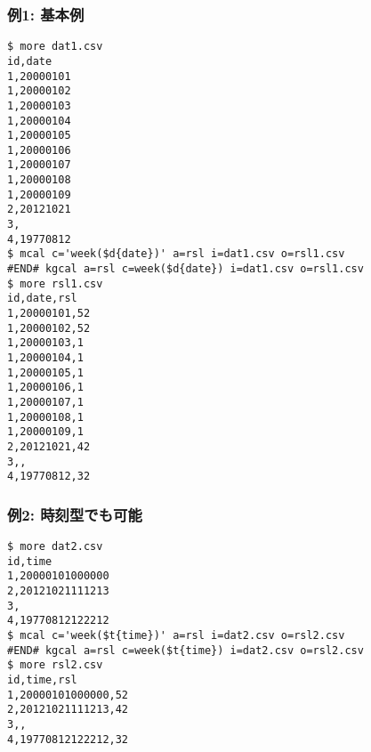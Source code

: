 \subsubsection*{例1: 基本例}



\begin{Verbatim}[baselinestretch=0.7,frame=single]
$ more dat1.csv
id,date
1,20000101
1,20000102
1,20000103
1,20000104
1,20000105
1,20000106
1,20000107
1,20000108
1,20000109
2,20121021
3,
4,19770812
$ mcal c='week($d{date})' a=rsl i=dat1.csv o=rsl1.csv
#END# kgcal a=rsl c=week($d{date}) i=dat1.csv o=rsl1.csv
$ more rsl1.csv
id,date,rsl
1,20000101,52
1,20000102,52
1,20000103,1
1,20000104,1
1,20000105,1
1,20000106,1
1,20000107,1
1,20000108,1
1,20000109,1
2,20121021,42
3,,
4,19770812,32
\end{Verbatim}
\subsubsection*{例2: 時刻型でも可能}



\begin{Verbatim}[baselinestretch=0.7,frame=single]
$ more dat2.csv
id,time
1,20000101000000
2,20121021111213
3,
4,19770812122212
$ mcal c='week($t{time})' a=rsl i=dat2.csv o=rsl2.csv
#END# kgcal a=rsl c=week($t{time}) i=dat2.csv o=rsl2.csv
$ more rsl2.csv
id,time,rsl
1,20000101000000,52
2,20121021111213,42
3,,
4,19770812122212,32
\end{Verbatim}
